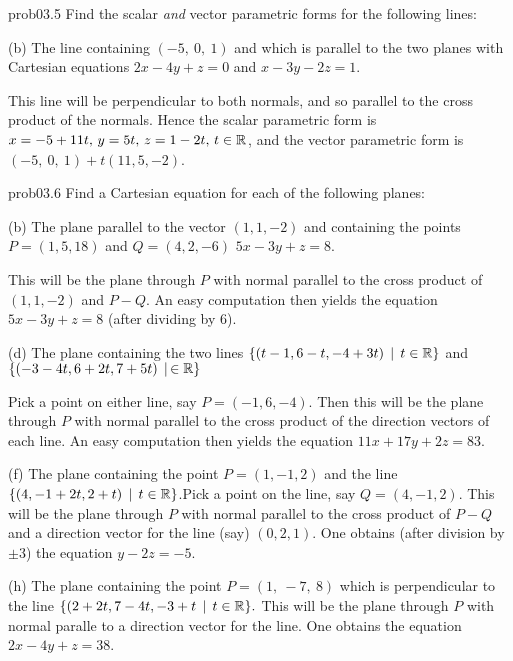 \begin{sol}{prob03.5}  Find the scalar {\it and} vector parametric forms for  the following lines:
\medskip


(b)  The line containing $(-5,\ 0,\ 1)$ and which is parallel to the two planes with Cartesian equations $2x-4y+z=0$ and  $x-3y-2z=1$. 

\soln This line will be perpendicular to both normals, and so parallel to the cross product of the normals. Hence the scalar parametric form is $x=-5+11t,\, y=5t,\, z=1-2t,\, t\in \mathbb{R}$, and the vector parametric form is $(-5,\ 0,\ 1) + t(11,5,-2)$.\medskip

\end{sol} 
\begin{sol}{prob03.6}  Find a Cartesian equation for each of the following planes:

\medskip

(b)   The plane parallel to the vector $(1, 1, -2)$  and containing  the points $P=(1, 5, 18)$ and $Q=(4, 2, -6)$  
$5x - 3y + z = 8$. 

\soln This will be the plane through $P$ with normal parallel to the cross product of $(1, 1, -2)$ and $P-Q$. An easy computation then yields the equation $5x - 3y + z = 8$ (after dividing by 6).
\medskip

 

(d)  The plane containing the   two lines 
$ \{(t-1,6-t,-4+3t)\,\mid \, t \in \mathbb{R} \}$ and  $ \{(-3 -4t, 6+ 2t,  7+5t)\,\mid \, \in \mathbb{R} \} $     

\soln Pick a point on either line, say $P=(-1,6,-4)$. Then this will be the plane through $P$ with normal parallel to the cross product of the direction vectors of each line. An easy computation then yields the equation $11x + 17y + 2z = 83$.
\medskip 

 

(f) The plane containing the point $P=(1, -1, 2)$  and the line $\{(4, -1 + 2t,2 + t)\,\mid \, t \in \mathbb{R} \}$.\soln Pick a  point on the line, say $Q=(4,-1,2)$. This will be the plane through $P$ with normal parallel to the cross product of $P-Q$ and a direction vector for the line (say) $(0,2,1)$. One obtains (after division by $\pm3$) the equation $y - 2z =- 5$.\medskip
% 

 

(h) The plane containing the point $P=(1,\ -7,\ 8)$ which is perpendicular to the line $\{(2+2t,7-4t,-3+t\,\mid \,  t\in \mathbb{R} \}.$ \soln This will be the plane through $P$ with normal paralle to a direction vector for the line. One obtains the equation $2x-4y+z=38$.\medskip  

\end{sol}

